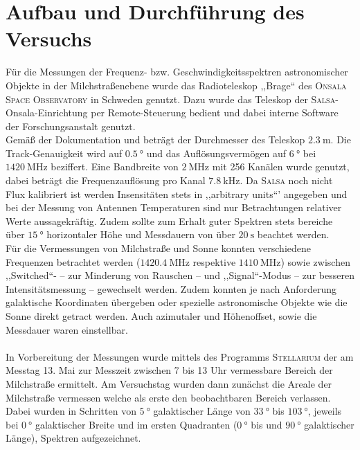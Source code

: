 \section{Aufbau und Durchführung des Versuchs}
\label{sec:Aufbau}
Für die Messungen der Frequenz- bzw. Geschwindigkeitsspektren astronomischer Objekte in der Milchstraßenebene wurde das Radioteleskop ,,Brage`` des \textsc{Onsala Space Observatory} in Schweden genutzt.
Dazu wurde das Teleskop der \textsc{Salsa}-Onsala-Einrichtung per Remote-Steuerung bedient und dabei interne Software der Forschungsanstalt genutzt.\\
Gemäß der Dokumentation \cite{Usermanual} und \cite{AntennaResp} beträgt der Durchmesser des Teleskop $\SI{2.3}{\metre}$. Die Track-Genauigkeit wird auf $\SI{0.5}{\degree}$ und das Auflösungsvermögen auf $\SI{6}{\degree}$ bei $\SI{1420}{\mega \hertz}$ beziffert.
Eine Bandbreite von $\SI{2}{\mega \hertz}$ mit 256 Kanälen wurde genutzt, dabei beträgt die Frequenzauflösung pro Kanal $\SI{7.8}{\kilo \hertz}$.
Da \textsc{Salsa} noch nicht Flux kalibriert ist werden Insensitäten stets in ,,arbitrary units``' angegeben und bei der Messung von Antennen Temperaturen sind nur Betrachtungen relativer Werte aussagekräftig.
Zudem sollte zum Erhalt guter Spektren stets bereiche über $\SI{15}{\degree}$ horizontaler Höhe und Messdauern von über $\SI{20}{\second}$ beachtet werden.\\%
Für die Vermessungen von Milchstraße und Sonne konnten verschiedene Frequenzen betrachtet werden ($\SI{1420.4}{\mega \hertz}$ respektive $\SI{1410}{\mega \hertz}$) sowie zwischen ,,Switched``- -- zur Minderung von Rauschen --  und ,,Signal``-Modus -- zur besseren Intensitätsmessung -- gewechselt werden.
Zudem konnten je nach Anforderung galaktische Koordinaten übergeben oder spezielle astronomische Objekte wie die Sonne direkt getract werden.
Auch azimutaler und Höhenoffset, sowie die Messdauer waren einstellbar.\\ 
\\ 
In Vorbereitung der Messungen wurde mittels des Programms \textsc{Stellarium} der am Messtag 13. Mai zur Messzeit zwischen 7 bis 13 Uhr vermessbare Bereich der Milchstraße ermittelt.
Am Versuchstag wurden dann zunächst die Areale der Milchstraße vermessen welche als erste den beobachtbaren Bereich verlassen.
Dabei wurden in Schritten von $\SI{5}{\degree}$ galaktischer Länge von $\SI{33}{\degree}$ bis $\SI{103}{\degree}$, jeweils bei $\SI{0}{\degree}$ galaktischer Breite und im ersten Quadranten ($\SI{0}{\degree}$ bis und $\SI{90}{\degree}$ galaktischer Länge), Spektren aufgezeichnet.

